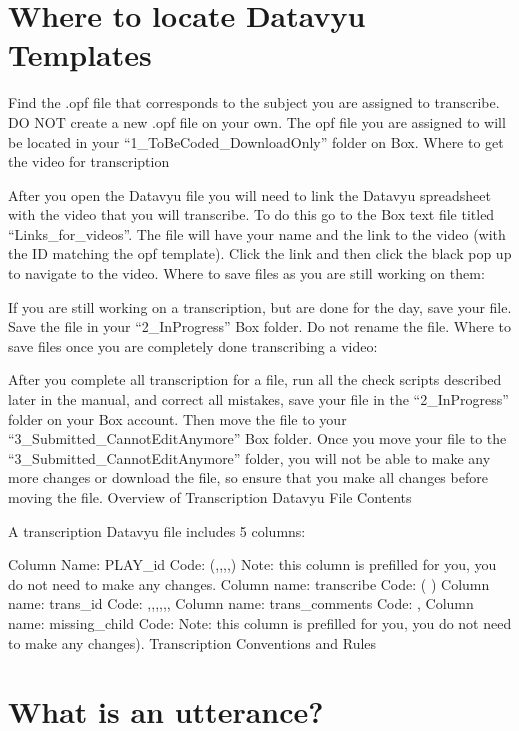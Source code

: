 \documentclass[
]{book}
\begin{document}
\hypertarget{where-to-locate-datavyu-templates}{%
\section{Where to locate Datavyu Templates}\label{where-to-locate-datavyu-templates}}

Find the .opf file that corresponds to the subject you are assigned to transcribe. DO NOT create a new .opf file on your own. The opf file you are assigned to will be located in your ``1\_ToBeCoded\_DownloadOnly'' folder on Box.
Where to get the video for transcription

After you open the Datavyu file you will need to link the Datavyu spreadsheet with the video that you will transcribe. To do this go to the Box text file titled ``Links\_for\_videos''. The file will have your name and the link to the video (with the ID matching the opf template). Click the link and then click the black pop up to navigate to the video.
Where to save files as you are still working on them:

If you are still working on a transcription, but are done for the day, save your file. Save the file in your ``2\_InProgress'' Box folder. Do not rename the file.
Where to save files once you are completely done transcribing a video:

After you complete all transcription for a file, run all the check scripts described later in the manual, and correct all mistakes, save your file in the ``2\_InProgress'' folder on your Box account. Then move the file to your ``3\_Submitted\_CannotEditAnymore'' Box folder.
Once you move your file to the ``3\_Submitted\_CannotEditAnymore'' folder, you will not be able to make any more changes or download the file, so ensure that you make all changes before moving the file.
Overview of Transcription Datavyu File Contents

A transcription Datavyu file includes 5 columns:

Column Name: PLAY\_id
Code: (,,,,)
Note: this column is prefilled for you, you do not need to make any changes.
Column name: transcribe
Code: ( )
Column name: trans\_id
Code: ,,,,,,
Column name: trans\_comments
Code: ,
Column name: missing\_child
Code:
Note: this column is prefilled for you, you do not need to make any changes).
Transcription Conventions and Rules

\hypertarget{what-is-an-utterance}{%
\section{What is an utterance?}\label{what-is-an-utterance}}
\end{document}

